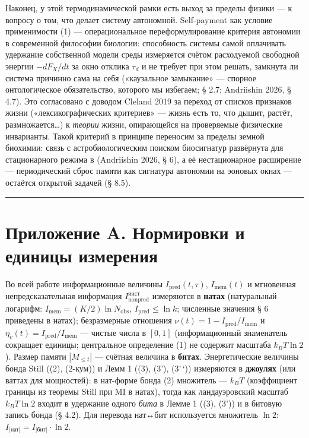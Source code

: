 \documentclass[pdflatex,sn-mathphys-ay]{sn-jnl}
\begin{document}
Наконец, у этой термодинамической рамки есть выход за пределы физики --- к вопросу о том, что делает систему автономной. Self-payment как условие применимости (1) --- операциональное переформулирование критерия автономии в современной философии биологии: способность системы самой оплачивать удержание собственной модели среды измеряется счётом расходуемой свободной энергии \(-dF_X/dt\) за окно отклика \(\tau_d\) и не требует при этом решать, замкнута ли система причинно сама на себя («каузальное замыкание» --- спорное онтологическое обязательство, которого мы избегаем; § 2.7; Andriishin 2026, § 4.7). Это согласовано с доводом Cleland 2019 за переход от списков признаков жизни («лексикографических критериев» --- жизнь есть то, что дышит, растёт, размножается\ldots) к \emph{теории} жизни, опирающейся на проверяемые физические инварианты. Такой критерий в принципе переносим за пределы земной биохимии: связь с астробиологическим поиском биосигнатур развёрнута для стационарного режима в (Andriishin 2026, § 6), а её нестационарное расширение --- периодический сброс памяти как сигнатура автономии на эоновых окнах --- остаётся открытой задачей (§ 8.5).



\begin{center}\rule{0.5\linewidth}{0.5pt}\end{center}



\section{Приложение A. Нормировки и единицы измерения}\label{ux43fux440ux438ux43bux43eux436ux435ux43dux438ux435-a.-ux43dux43eux440ux43cux438ux440ux43eux432ux43aux438-ux438-ux435ux434ux438ux43dux438ux446ux44b-ux438ux437ux43cux435ux440ux435ux43dux438ux44f}



Во всей работе информационные величины \(I_{\text{pred}}(t,\tau)\), \(I_{\text{mem}}(t)\) и мгновенная непредсказательная информация \(I_{\text{nonpred}}^{\text{инст}}\) измеряются в \textbf{натах} (натуральный логарифм: \(I_{\text{mem}} = (K/2)\ln N_{\text{obs}}\), \(I_{\text{pred}} \le \ln k\); численные значения § 6 приведены в натах); безразмерные отношения \(\nu(t) = 1 - I_{\text{pred}}/I_{\text{mem}}\) и \(\eta_v(t) = I_{\text{pred}}/I_{\text{mem}}\) --- чистые числа в \([0,1]\) (информационный знаменатель сокращает единицы; центральное определение (1) не содержит масштаба \(k_B T \ln 2\)). Размер памяти \(|M_{\le t}|\) --- счётная величина в \textbf{битах}. Энергетические величины бонда Still ((2), (2-кум)) и Лемм 1 ((3), (3'), (3'\,`)) измеряются в \textbf{джоулях} (или ваттах для мощностей): в нат-форме бонда (2) множитель --- \(k_B T\) (коэффициент границы из теоремы Still при MI в натах), тогда как ландауэровский масштаб \(k_B T \ln 2\) входит в удержание одного \emph{бита} в Лемме 1 ((3), (3')) и в битовую запись бонда (§ 4.2). Для перевода нат↔бит используется множитель \(\ln 2\): \(I_{\text{[нат]}} = I_{\text{[бит]}} \cdot \ln 2\).
\end{document}
